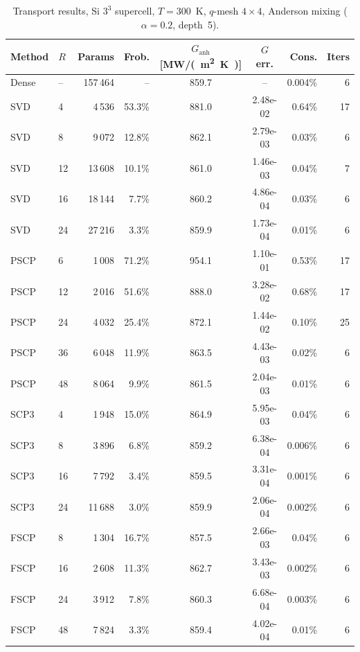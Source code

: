 \documentclass[11pt]{article}
\begin{document}
\begin{table}[ht]
\centering
\caption{Transport results, Si $3^3$ supercell, $T=300$~K,
$q$-mesh $4\!\times\!4$, Anderson mixing ($\alpha=0.2$, depth~5).}
\label{tab:transport-333}
\begin{tabular}{@{}llrrS[table-format=4.1]S[table-format=1.2e-1]rr@{}}
\toprule
\textbf{Method} & $R$ & \textbf{Params} &
  {\textbf{Frob.}} &
  {$G_\mathrm{anh}$ [\si{MW/(m^2.K)}]} &
  {\textbf{$G$ err.}} &
  {\textbf{Cons.}} &
  {\textbf{Iters}} \\
\midrule
Dense & -- & 157\,464 & --     & 859.7 & {--}      & 0.004\% & 6 \\
\midrule
SVD   &  4 &  4\,536 & 53.3\% &  881.0 & 2.48e-02 & 0.64\% & 17 \\
SVD   &  8 &  9\,072 & 12.8\% &  862.1 & 2.79e-03 & 0.03\% &  6 \\
SVD   & 12 & 13\,608 & 10.1\% &  861.0 & 1.46e-03 & 0.04\% &  7 \\
SVD   & 16 & 18\,144 &  7.7\% &  860.2 & 4.86e-04 & 0.03\% &  6 \\
SVD   & 24 & 27\,216 &  3.3\% &  859.9 & 1.73e-04 & 0.01\% &  6 \\
\midrule
PSCP  &  6 &  1\,008 & 71.2\% &  954.1 & 1.10e-01 & 0.53\% & 17 \\
PSCP  & 12 &  2\,016 & 51.6\% &  888.0 & 3.28e-02 & 0.68\% & 17 \\
PSCP  & 24 &  4\,032 & 25.4\% &  872.1 & 1.44e-02 & 0.10\% & 25 \\
PSCP  & 36 &  6\,048 & 11.9\% &  863.5 & 4.43e-03 & 0.02\% &  6 \\
PSCP  & 48 &  8\,064 &  9.9\% &  861.5 & 2.04e-03 & 0.01\% &  6 \\
\midrule
SCP3  &  4 &  1\,948 & 15.0\% &  864.9 & 5.95e-03 & 0.04\% &  6 \\
SCP3  &  8 &  3\,896 &  6.8\% &  859.2 & 6.38e-04 & 0.006\% & 6 \\
SCP3  & 16 &  7\,792 &  3.4\% &  859.5 & 3.31e-04 & 0.001\% & 6 \\
SCP3  & 24 & 11\,688 &  3.0\% &  859.9 & 2.06e-04 & 0.002\% & 6 \\
\midrule
FSCP  &  8 &  1\,304 & 16.7\% &  857.5 & 2.66e-03 & 0.04\% &  6 \\
FSCP  & 16 &  2\,608 & 11.3\% &  862.7 & 3.43e-03 & 0.002\% & 6 \\
FSCP  & 24 &  3\,912 &  7.8\% &  860.3 & 6.68e-04 & 0.003\% & 6 \\
FSCP  & 48 &  7\,824 &  3.3\% &  859.4 & 4.02e-04 & 0.01\% &  6 \\
\bottomrule
\end{tabular}
\end{table}
\end{document}
